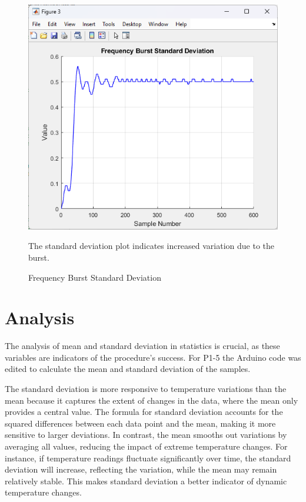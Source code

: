 \documentclass[journal]{IEEEtran}
\begin{document}
\begin{figure}[H]
    \centering
    \includegraphics[width=\linewidth]{5.2.3.png}
    \caption{Frequency Burst Standard Deviation}
    \begin{minipage}{\linewidth}
      The standard deviation plot indicates increased variation due to the burst.
    \end{minipage}
    \label{fig:frequency_burst_stddev}
\end{figure}

\section{Analysis}
The analysis of mean and standard deviation in statistics is crucial, as these variables are indicators of the procedure's success. For P1-5 the Arduino code was edited to calculate the mean and standard deviation of the samples. \par

The standard deviation is more responsive to temperature variations than the mean because it captures the extent of changes in the data, where the mean only provides a central value. The formula for standard deviation accounts for the squared differences between each data point and the mean, making it more sensitive to larger deviations. In contrast, the mean smooths out variations by averaging all values, reducing the impact of extreme temperature changes. For instance, if temperature readings fluctuate significantly over time, the standard deviation will increase, reflecting the variation, while the mean may remain relatively stable. This makes standard deviation a better indicator of dynamic temperature changes.
\end{document}
